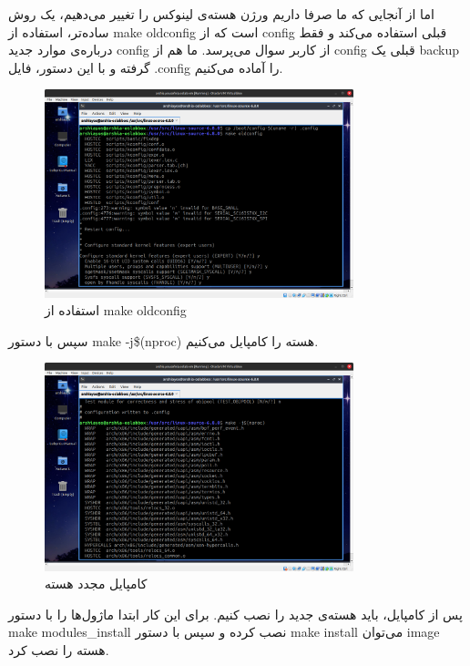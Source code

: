 \documentclass[12pt]{article}
\begin{document}
        اما از آنجایی که ما صرفا داریم ورژن هسته‌ی لینوکس را تغییر می‌دهیم، یک روش ساده‌تر، استفاده از 
        \textenglish{make oldconfig}
        است که از 
        config
        قبلی استفاده می‌کند و فقط درباره‌ی موارد جدید 
        config
        از کاربر سوال می‌پرسد. ما هم از 
        config
        قبلی یک 
        backup
        گرفته و با این دستور، فایل
        \textenglish{.config}
        را آماده می‌کنیم.

        \begin{figure}[H]
		\centering
		\includegraphics[width=0.8\textwidth]{report1-resources/40.png}
		\caption{استفاده از \textenglish{make oldconfig}}
	\end{figure}

        سپس با دستور 
        \textenglish{make -j\$(nproc)}
        هسته را کامپایل می‌کنیم.

        \begin{figure}[H]
		\centering
		\includegraphics[width=0.8\textwidth]{report1-resources/42.png}
		\caption{کامپایل مجدد هسته}
	\end{figure}

        پس از کامپایل، باید هسته‌ی جدید را نصب کنیم. برای این کار ابتدا ماژول‌ها را با دستور
        \textenglish{make modules\_install}
        نصب کرده و سپس با دستور
        \textenglish{make install}
        می‌توان
        image
        هسته را نصب کرد.
\end{document}
